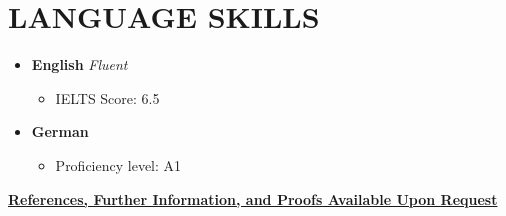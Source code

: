 \documentclass[11pt,a4paper,sans]{moderncv} %
\begin{document}
\section{LANGUAGE SKILLS}

\begin{itemize}
    \item \textbf{English} \hspace{6 pt} \textit{Fluent}
    \begin{itemize}
        \item IELTS Score: 6.5
    \end{itemize}
    \item \textbf{German} \hspace{6 pt}
    \begin{itemize}
        \item Proficiency level: A1
    \end{itemize}
\end{itemize}







\vspace{2em}
\centerline{\underline{\textbf{\faExclamationCircle \hspace{0.5pt} References, Further Information, and Proofs Available Upon Request}}}
\end{document}
